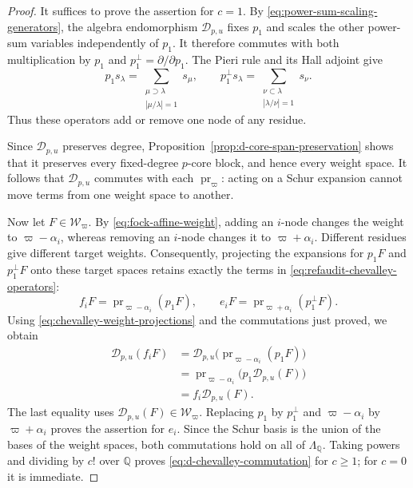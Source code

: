 \documentclass[12pt,reqno,a4paper]{amsart}
\numberwithin{equation}{section}
\numberwithin{figure}{section}
\theoremstyle{plain}
\theoremstyle{definition}
\begin{document}
\begin{proof}
It suffices to prove the assertion for $c=1$.  By
\eqref{eq:power-sum-scaling-generators}, the algebra endomorphism
$\mathcal D_{p,u}$ fixes $p_1$ and scales the other power-sum
variables independently of $p_1$.  It therefore commutes with both
multiplication by $p_1$ and $p_1^\perp=\partial/\partial p_1$.
The Pieri rule and its Hall adjoint give
\[
p_1s_\lambda=\sum_{\substack{\mu\supset\lambda\\
|\mu/\lambda|=1}}s_\mu,
\qquad
p_1^\perp s_\lambda=\sum_{\substack{\nu\subset\lambda\\
|\lambda/\nu|=1}}s_\nu.
\]
Thus these operators add or remove one node of any residue.

Since $\mathcal D_{p,u}$ preserves degree,
Proposition~\ref{prop:d-core-span-preservation} shows that it
preserves every fixed-degree $p$-core block, and hence every weight
space.  It follows that $\mathcal D_{p,u}$ commutes with each
$\operatorname{pr}_\varpi$: acting on a Schur expansion cannot
move terms from one weight space to another.

Now let $F\in\mathcal W_\varpi$.  By
\eqref{eq:fock-affine-weight}, adding an $i$-node changes the weight
to $\varpi-\alpha_i$, whereas removing an $i$-node changes it to
$\varpi+\alpha_i$.  Different residues give different target
weights.  Consequently, projecting the expansions for $p_1F$ and
$p_1^\perp F$ onto these target spaces retains exactly the terms
in \eqref{eq:refaudit-chevalley-operators}:
\begin{equation}\label{eq:chevalley-weight-projections}
f_iF=\operatorname{pr}_{\varpi-\alpha_i}(p_1F),
\qquad
e_iF=\operatorname{pr}_{\varpi+\alpha_i}(p_1^\perp F).
\end{equation}
Using \eqref{eq:chevalley-weight-projections} and the commutations
just proved, we obtain
\[
\begin{aligned}
\mathcal D_{p,u}(f_iF)
&=\mathcal D_{p,u}\bigl(\operatorname{pr}_{\varpi-\alpha_i}(p_1F)\bigr)\\
&=\operatorname{pr}_{\varpi-\alpha_i}\bigl(p_1\mathcal D_{p,u}(F)\bigr)\\
&=f_i\mathcal D_{p,u}(F).
\end{aligned}
\]
The last equality uses $\mathcal D_{p,u}(F)\in\mathcal W_\varpi$.
Replacing $p_1$ by $p_1^\perp$ and $\varpi-\alpha_i$ by
$\varpi+\alpha_i$ proves the assertion for $e_i$.  Since the Schur
basis is the union of the bases of the weight spaces, both
commutations hold on all of $\Lambda_{\mathbb Q}$.  Taking powers
and dividing by $c!$ over $\mathbb Q$ proves
\eqref{eq:d-chevalley-commutation} for $c\geq1$; for $c=0$ it is
immediate.
\end{proof}
\end{document}

